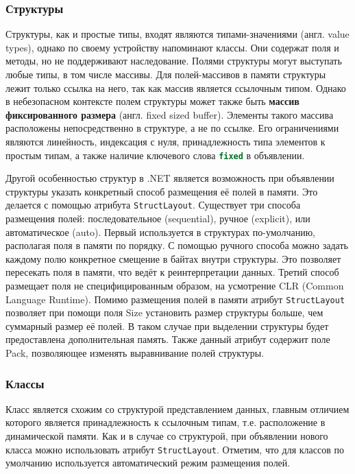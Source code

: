 \subsubsection{Структуры}
Структуры, как и простые типы, входят являются типами-значениями (англ. value types), однако по своему устройству напоминают классы. Они содержат поля и методы, но не поддерживают наследование. Полями структуры могут выступать любые типы, в том числе массивы. Для полей-массивов в памяти структуры лежит только ссылка на него, так как массив является ссылочным типом. Однако в небезопасном контексте полем структуры может также быть \textbf{массив фиксированного размера} (англ. fixed sized buffer). Элементы такого массива расположены непосредственно в структуре, а не по ссылке. Его ограничениями являются линейность, индексация с нуля, принадлежность типа элементов к простым типам, а также наличие ключевого слова \lstinline[language=csharp]{fixed} в объявлении.

Другой особенностью структур в .NET является возможность при объявлении структуры указать конкретный способ размещения её полей в памяти. Это делается с помощью атрибута \lstinline[language=csharp]{StructLayout}. Существует три способа размещения полей: последовательное (sequential), ручное (explicit), или автоматическое (auto). Первый используется в структурах по-умолчанию, располагая поля в памяти по порядку. С помощью ручного способа можно задать каждому полю конкретное смещение в байтах внутри структуры. Это позволяет пересекать поля в памяти, что ведёт к реинтерпретации данных. Третий способ размещает поля не специфицированным образом, на усмотрение CLR (Common Language Runtime). Помимо размещения полей в памяти атрибут \lstinline[language=csharp]{StructLayout} позволяет при помощи поля Size установить размер структуры больше, чем суммарный размер её полей. В таком случае при выделении структуры будет предоставлена дополнительная память. Также данный атрибут содержит поле Pack, позволяющее изменять выравнивание полей структуры.

\subsubsection{Классы}
Класс является схожим со структурой представлением данных, главным отличием которого является принадлежность к ссылочным типам, т.е. расположение в динамической памяти. Как и в случае со структурой, при объявлении нового класса можно использовать атрибут \lstinline[language=csharp]{StructLayout}. Отметим, что для классов по умолчанию используется автоматический режим размещения полей.

